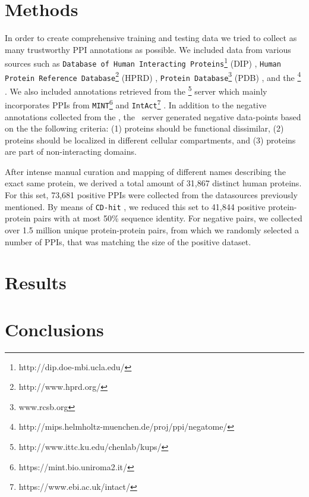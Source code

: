 \documentclass{article}
\begin{document}
 \section*{Methods}

In order to create comprehensive training and testing data we tried to
collect as many trustworthy PPI annotations as possible. We included
data from various sources such as \texttt{Database of Human
  Interacting Proteins}\footnote{http://dip.doe-mbi.ucla.edu/} (DIP)
\cite{Salwinski:2004}, \texttt{Human Protein Reference
  Database}\footnote{http://www.hprd.org/} (HPRD)
\cite{Keshava_Prasad:2009}, \texttt{Protein
  Database}\footnote{www.rcsb.org} (PDB) \cite{Berman:2000}, and the
\nega\footnote{http://mips.helmholtz-muenchen.de/proj/ppi/negatome/}
\cite{Blohm:2014}. We also included annotations retrieved from the
\kups \footnote{http://www.ittc.ku.edu/chenlab/kups/}   server
\cite{Chen:2011} which mainly incorporates PPIs from
\texttt{MINT}\footnote{https://mint.bio.uniroma2.it/}
\cite{Licata:2012} and
\texttt{IntAct}\footnote{https://www.ebi.ac.uk/intact/}
\cite{Orchard:2014}. In addition to the negative annotations collected
from the \nega, the \kups\ server generated negative data-points based
on the the following criteria: (1) proteins should be functional
dissimilar, (2) proteins should be localized in different cellular
compartments, and (3) proteins are part of non-interacting domains. 

After intense manual curation and mapping of different names describing
the exact same protein, we derived a total amount of 31,867 distinct
human proteins. For this set, 73,681 positive PPIs were collected
from the datasources previously mentioned. By means of \texttt{CD-hit}
\cite{Li:2006, Fu:2012}, we reduced this set to 41,844 positive
protein-protein pairs with at most 50\% sequence identity. For
negative pairs, we collected over 1.5 million unique protein-protein
pairs, from which we randomly selected a number of PPIs, that was
matching the size of the positive dataset.



 \section*{Results}

 
 \section*{Conclusions}
\end{document}
